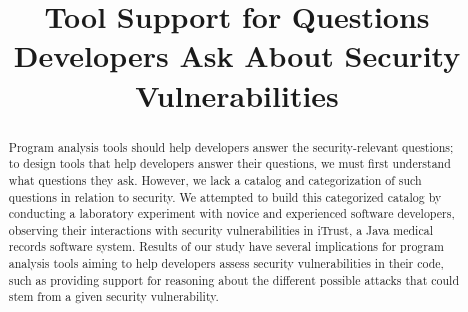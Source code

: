 \documentclass[conference]{IEEEtran}
\begin{document}
%

\title{Tool Support for Questions Developers Ask About Security Vulnerabilities}

\author{
\and
{}
}

\maketitle

\begin{abstract}

Program analysis tools should help developers answer the security-relevant questions; to design tools that help developers answer their questions, we must first understand what questions they ask.
However, we lack a catalog and categorization of such questions in relation to security. 
We attempted to build this categorized catalog by conducting a laboratory experiment with novice and experienced software developers, observing their interactions with security vulnerabilities in iTrust, a Java medical records software system.
Results of our study have several implications for program analysis tools aiming to help developers assess security vulnerabilities in their code, such as providing support for reasoning about the different possible attacks that could stem from a given security vulnerability.



\end{abstract}

%
\IEEEpeerreviewmaketitle
\end{document}
